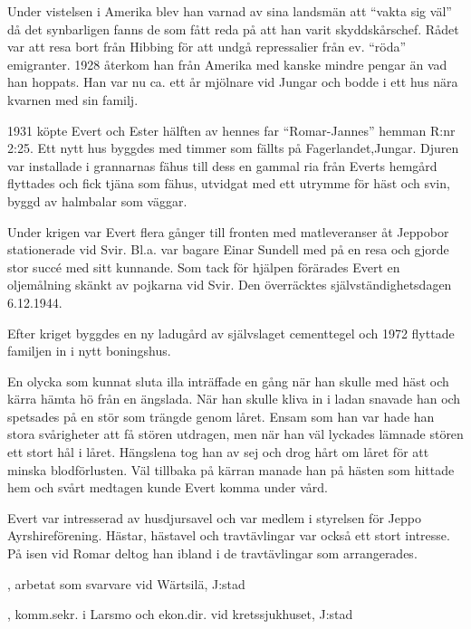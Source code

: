 Under vistelsen i Amerika blev han varnad av sina landsmän att ``vakta sig väl'' då det synbarligen fanns de som fått reda på att han varit skyddskårschef. Rådet var att resa bort från Hibbing för att undgå repressalier från ev. ``röda'' emigranter. 1928 återkom han från Amerika med kanske mindre pengar än vad han hoppats. Han var nu ca. ett år mjölnare vid Jungar och bodde i ett hus nära kvarnen med sin familj.

1931 köpte Evert och Ester hälften av hennes far ``Romar-Jannes'' hemman R:nr 2:25. Ett nytt hus byggdes med timmer som fällts på Fagerlandet,Jungar. Djuren var installade i grannarnas fähus till dess en gammal ria från Everts hemgård flyttades och fick tjäna som fähus, utvidgat med  ett utrymme för häst och svin, byggd av halmbalar som väggar.

Under krigen var Evert flera gånger till fronten med matleveranser åt Jeppobor stationerade vid Svir. Bl.a. var bagare Einar Sundell med på en resa och gjorde stor succé med sitt kunnande. Som tack för hjälpen förärades Evert en oljemålning skänkt av pojkarna vid Svir. Den överräcktes självständighetsdagen 6.12.1944.

Efter kriget byggdes en ny ladugård av självslaget cementtegel och 1972 flyttade familjen in i nytt boningshus.

En olycka som kunnat sluta illa inträffade en gång när han skulle med häst och kärra hämta hö från en ängslada. När han skulle kliva in i ladan snavade han och spetsades på en stör som trängde genom låret. Ensam som han var hade han stora svårigheter att få stören utdragen, men när han väl lyckades lämnade stören ett stort hål i låret. Hängslena tog han av sej och drog hårt om låret för att minska blodförlusten. Väl tillbaka på kärran manade han på hästen som hittade hem och svårt medtagen kunde Evert komma under vård.

Evert var intresserad av husdjursavel och var medlem i styrelsen för Jeppo Ayrshireförening. Hästar, hästavel och travtävlingar var också ett stort intresse. På isen vid Romar deltog han ibland i de travtävlingar som arrangerades.
\begin{jhchildren}
  \item {}
  \item {}, arbetat som svarvare vid Wärtsilä, J:stad
  \item {}
  \item {}, komm.sekr. i Larsmo och ekon.dir. vid kretssjukhuset, J:stad
\end{jhchildren}


